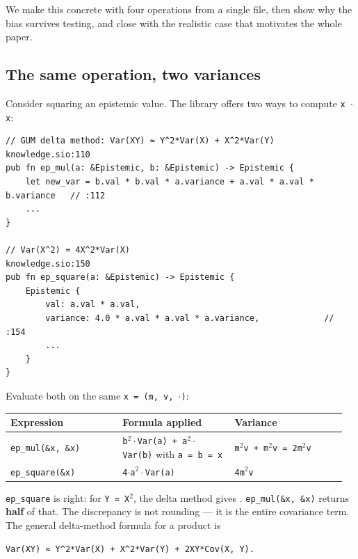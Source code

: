 \documentclass[sigplan,review,anonymous,10pt]{acmart}
\begin{document}
We make this concrete with four operations from a single file, then show why the bias survives testing, and close with the realistic case that motivates the whole paper.

\subsection{The same operation, two variances}

Consider squaring an epistemic value. The library offers two ways to compute \texttt{x $\cdot$ x}:

\begin{lstlisting}
// GUM delta method: Var(XY) ≈ Y^2*Var(X) + X^2*Var(Y)          knowledge.sio:110
pub fn ep_mul(a: &Epistemic, b: &Epistemic) -> Epistemic {
    let new_var = b.val * b.val * a.variance + a.val * a.val * b.variance   // :112
    ...
}

// Var(X^2) ≈ 4X^2*Var(X)                                        knowledge.sio:150
pub fn ep_square(a: &Epistemic) -> Epistemic {
    Epistemic {
        val: a.val * a.val,
        variance: 4.0 * a.val * a.val * a.variance,             // :154
        ...
    }
}
\end{lstlisting}

Evaluate both on the same \texttt{x = (m, v, $\cdot$)}:

\begin{table}[htbp]\centering\small
\begin{tabular}{p{0.32\linewidth}p{0.32\linewidth}p{0.32\linewidth}}
\toprule
Expression & Formula applied & Variance \\
\midrule
\texttt{ep\_mul(\&x, \&x)} & \texttt{b$^{2}\cdot$Var(a) + a$^{2}\cdot$Var(b)} with \texttt{a = b = x} & \texttt{m$^{2}$v + m$^{2}$v = 2m$^{2}$v} \\
\texttt{ep\_square(\&x)} & \texttt{4$\cdot$a$^{2}\cdot$Var(a)} & \texttt{4m$^{2}$v} \\
\bottomrule
\end{tabular}
\end{table}

\texttt{ep\_square} is right: for \texttt{Y = X$^{2}$}, the delta method gives . \texttt{ep\_mul(\&x, \&x)} returns \textbf{half} of that. The discrepancy is not rounding --- it is the entire covariance term. The general delta-method formula for a product is

\begin{lstlisting}
Var(XY) ≈ Y^2*Var(X) + X^2*Var(Y) + 2XY*Cov(X, Y).
\end{lstlisting}
\end{document}
